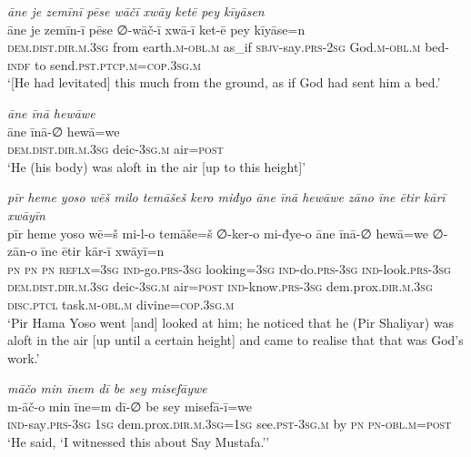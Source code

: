 \ea \label{ŽP.69}
\textit{āne je zemīnī pēse wāčī xwāy ketē pey kīyāsen} \\ 
\gll āne je zemīn-ī pēse ∅-wāč-ī xwā-ī ket-ē pey kīyāse=n \\ 
 \textsc{dem.dist}\textsc{.dir}\textsc{.m}\textsc{.3sg} from earth\textsc{.m}\textsc{-obl}\textsc{.m} as\_if \textsc{sbjv-}say\textsc{.prs-}\textsc{2sg} God\textsc{.m}\textsc{-obl}\textsc{.m} bed\textsc{-indf} to send\textsc{.pst}\textsc{.ptcp}\textsc{.m}\textsc{=cop}\textsc{.3sg}\textsc{.m} \\ 
\glt `[He had levitated] this much from the ground, as if God had sent him a bed.'
\z 
 
\ea \label{ŽP.70}
\textit{āne īnā hewāwe} \\ 
\gll āne īnā-∅ hewā=we \\ 
 \textsc{dem.dist}\textsc{.dir}\textsc{.m}\textsc{.3sg} deic\textsc{-3sg}\textsc{.m} air\textsc{=\textsc{post}} \\ 
\glt `He (his body) was aloft in the air [up to this height]'
\z 
 
\ea \label{ŽP.71}
\textit{pīr heme yoso wēš milo temāšeš kero miđyo āne īnā hewāwe zāno īne ētir kārī xwāyīn} \\ 
\gll pīr heme yoso wē=š mi-l-o temāše=š ∅-ker-o mi-đye-o āne īnā-∅ hewā=we ∅-zān-o īne ētir kār-ī xwāyī=n \\ 
 \textsc{pn} \textsc{pn} \textsc{pn} \textsc{reflx}\textsc{=3sg} \textsc{ind-}go\textsc{.prs}\textsc{-3sg} looking\textsc{=3sg} \textsc{ind-}do\textsc{.prs}\textsc{-3sg} \textsc{ind-}look\textsc{.prs}\textsc{-3sg} \textsc{dem.dist}\textsc{.dir}\textsc{.m}\textsc{.3sg} deic\textsc{-3sg}\textsc{.m} air\textsc{=\textsc{post}} \textsc{ind-}know\textsc{.prs}\textsc{-3sg} dem.prox\textsc{.dir}\textsc{.m}\textsc{.3sg} \textsc{disc.ptcl} task\textsc{.m}\textsc{-obl}\textsc{.m} divine\textsc{=cop}\textsc{.3sg}\textsc{.m} \\ 
\glt `Pir Hama Yoso went [and] looked at him; he noticed that he (Pir Shaliyar) was aloft in the air [up until a certain height] and came to realise that that was God’s work.'
\z 
 
\ea \label{ŽP.74}
\textit{māčo min īnem dī be sey misefāywe} \\ 
\gll m-āč-o min īne=m dī-∅ be sey misefā-ī=we \\ 
 \textsc{ind-}say\textsc{.prs}\textsc{-3sg} \textsc{1sg} dem.prox\textsc{.dir}\textsc{.m}\textsc{.3sg}\textsc{=\textsc{1sg}} see\textsc{.pst}\textsc{-3sg}\textsc{.m} by \textsc{pn} \textsc{pn}\textsc{-obl}\textsc{.m}\textsc{=\textsc{post}} \\ 
\glt `He said, ‘I witnessed this about Say Mustafa.’'
\z 
 

